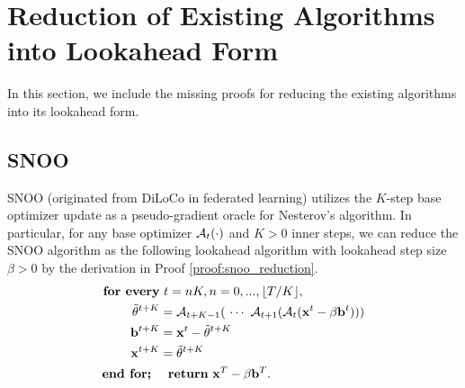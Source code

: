 \documentclass{article}
\theoremstyle{plain}
\theoremstyle{definition}
\theoremstyle{remark}
\def\bx{\mathbf{x}}
\def\btheta{\mathbf{\theta}}
\begin{document}


\newpage
\appendix

\section{Reduction of Existing Algorithms into Lookahead Form}
In this section, we include the missing proofs for reducing the existing algorithms into its lookahead form.

\subsection{SNOO} \label{sec:compare_snoo}
SNOO \citep{kallusky2025snoo} (originated from DiLoCo \citep{douillard2023diloco} in federated learning) utilizes the $K$-step base optimizer update as a pseudo-gradient oracle for Nesterov's algorithm. In particular, for any base optimizer ${\cal A}_t(\cdot)$ and $K > 0$ inner steps, we can reduce the SNOO algorithm as the following lookahead algorithm with lookahead step size $\beta > 0$ by the derivation in Proof \ref{proof:snoo_reduction}.
\begin{equation}  \label{eq:snoo_eta_1}
    \begin{aligned}
    \textbf{for every}&~ t=nK, n = 0, ..., \lfloor T/K \rfloor,\\
        \tilde{\btheta}^{t+K} &= {\cal A}_{t+K-1}(~\cdots ~{\cal A}_{t+1}( {\cal A}_t(\bx^t - \beta {\bf b}^t) ) ) \\
        {\bf b}^{t+K} &=  \bx^{t} - \tilde{\btheta}^{t+K} \\
        \bx^{t+K} &= \tilde{\btheta}^{t+K} \\
    \textbf{end for;}~~&~~\textbf{return}~\bx^T - \beta {\bf b}^T.
    \end{aligned}
\end{equation}
\end{document}
